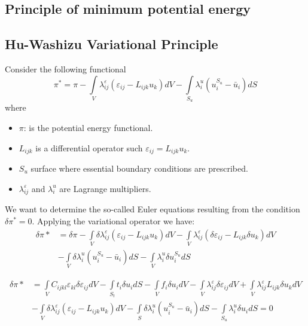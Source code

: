 \subsection{Principle of minimum potential energy}

\subsection{Hu-Washizu Variational Principle}
Consider the following functional
\begin{equation}
{\pi ^*} = \pi  - \int\limits_V {\lambda _{ij}^\varepsilon ({\varepsilon _{ij}} - {L_{ijk}}{u_k})dV}  - \int\limits_{{S_u}} {\lambda _i^u(u_i^{{S_u}} - {{\bar u}_i})dS}
\label{eq:Hu}
\end{equation}
where
\begin{itemize}
\item $\pi$: is the potential energy functional.
\item $L_{ijk}$ is a differential operator such ${\varepsilon _{ij}} = {L_{ijk}}{u_k}$.
\item $S_u$ surface where essential boundary conditions are prescribed.
\item $\lambda _{ij}^\varepsilon $ and ${\lambda _i^u}$ are Lagrange multipliers.
\end{itemize}

We want to determine the so-called Euler equations resulting from the condition $\delta \pi^* = 0$. Applying the variational operator we have:
\begin{equation}
\begin{aligned}
\delta \pi *& = \delta \pi  - \int\limits_V {\delta \lambda _{ij}^\varepsilon } ({\varepsilon _{ij}} - {L_{ijk}}{u_k})dV- \int\limits_V {\lambda _{ij}^\varepsilon } (\delta {\varepsilon _{ij}} - {L_{ijk}}\delta {u_k})dV \\
&-\int\limits_V {\delta \lambda _i^u} (u_i^{{S_u}} - {\bar u_i})dS - \int\limits_V {\lambda _i^u} \delta u_i^{{S_u}}dS
\end{aligned}
\end{equation}

\begin{equation}
\begin{aligned}
\delta \pi * &= \int\limits_V {{C_{ijkl}}{\varepsilon _{kl}}\delta {\varepsilon _{ij}}dV - \int\limits_{{S_t}} {{t_i}\delta {u_i}dS}  - \int\limits_V {{f_i}\delta {u_i}dV - } }\int\limits_V {\lambda _{ij}^\varepsilon \delta {\varepsilon _{ij}}dV}  + \int\limits_V {\lambda _{ij}^\varepsilon {L_{ijk}}\delta {u_k}dV}\\
&- \int\limits_V {\delta \lambda _{ij}^\varepsilon ({\varepsilon _{ij}} - {L_{ijk}}{u_k})dV - \int\limits_S {\delta \lambda _i^u(u_i^{{S_u}} - {{\bar u}_i})dS - \int\limits_{{S_u}} {\lambda _i^u\delta {u_i}dS = 0} } }
\end{aligned}
\end{equation}

